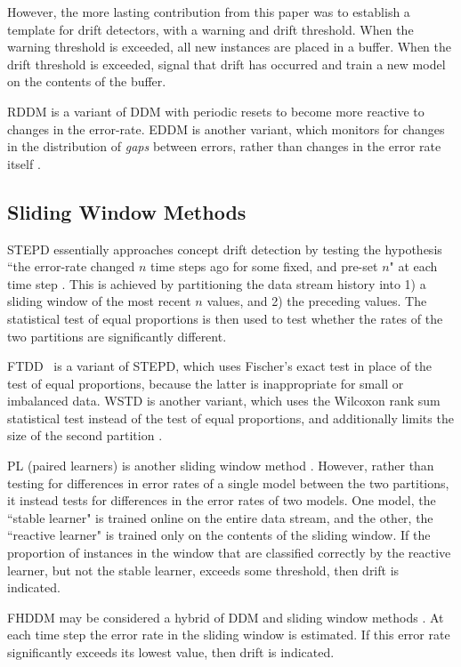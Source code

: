 However, the more lasting contribution from this paper was to establish a template for drift detectors, with a warning and drift threshold. When the warning threshold is exceeded, all new instances are placed in a buffer. When the drift threshold is exceeded, signal that drift has occurred and train a new model on the contents of the buffer.

RDDM is a variant of DDM with periodic resets to become more reactive to changes in the error-rate. EDDM is another variant, which monitors for changes in the distribution of {\it gaps} between errors, rather than changes in the error rate itself \cite{EDDM}.

\subsection{Sliding Window Methods}

STEPD essentially approaches concept drift detection by testing the hypothesis ``the error-rate changed $n$ time steps ago for some fixed, and pre-set $n$" at each time step \cite{STEPD}. This is achieved by partitioning the data stream history into 1) a sliding window of the most recent $n$ values, and 2) the preceding values. The statistical test of equal proportions is then used to test whether the rates of the two partitions are significantly different.

FTDD \cite{FTDD}%
~is a variant of STEPD, which uses Fischer's exact test %
in place of the test of equal proportions, because the latter is inappropriate for small or imbalanced data. WSTD is another variant, which uses the Wilcoxon rank sum statistical test instead of the test of equal proportions, and additionally limits the size of the second partition \cite{WSTD}.

PL (paired learners) is another sliding window method \cite{PL}. However, rather than testing for differences in error rates of a single model between the two partitions, it instead tests for differences in the error rates of two models. One model, the ``stable learner" is trained online on the entire data stream, and the other, the ``reactive learner" is trained only on the contents of the sliding window. If the proportion of instances in the window that are classified correctly by the reactive learner, but not the stable learner, exceeds some threshold, then drift is indicated.

FHDDM may be considered a hybrid of DDM and sliding window methods \cite{FHDDM}. At each time step the error rate in the sliding window is estimated. If this error rate significantly exceeds its lowest value, then drift is indicated.

